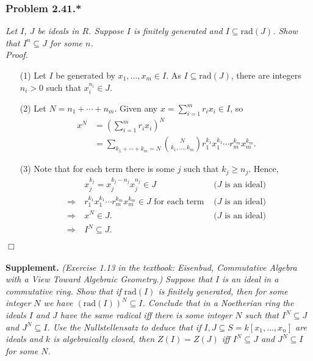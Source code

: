 \documentclass{article}
\begin{document}



\subsubsection*{Problem 2.41.*}
\emph{Let $I$, $J$ be ideals in $R$.
Suppose $I$ is finitely generated and $I \subseteq \mathrm{rad}(J)$.
Show that $I^n \subseteq J$ for some $n$.} \\

\emph{Proof.}
\begin{enumerate}
\item[(1)]
  Let $I$ be generated by $x_1,\ldots,x_m \in I$.
  As $I \subseteq \mathrm{rad}(J)$, there are integers $n_i > 0$
  such that $x_i^{n_i} \in J$.

\item[(2)]
  Let $N = n_1 + \cdots + n_m$.
  Given any $x = \sum_{i=1}^{m} r_i x_i \in I$,
  so
  \begin{align*}
    x^N
    &= \left( \sum_{i=1}^{m} r_i x_i \right)^{N} \\
    &= \sum_{k_1 + \cdots + k_m = N} {N \choose k_1,\ldots,k_m}
      r_1^{k_1} x_1^{k_1} \cdots r_m^{k_m} x_m^{k_m}.
  \end{align*}

\item[(3)]
  Note that for each term there is some $j$ such that $k_j \geq n_j$.
  Hence,
  \begin{align*}
    & \: x_j^{k_j} = x_j^{k_j-n_j} x_j^{n_j} \in J
      &\text{($J$ is an ideal)} \\
    \Longrightarrow& \:
    r_1^{k_1} x_1^{k_1} \cdots r_m^{k_m} x_m^{k_m} \in J \text{ for each term }
      &\text{($J$ is an ideal)} \\
    \Longrightarrow& \:
    x^N \in J.
      &\text{($J$ is an ideal)} \\
    \Longrightarrow& \:
      I^N \subseteq J.
  \end{align*}
\end{enumerate}
$\Box$ \\\\



\textbf{Supplement.}
\emph{(Exercise 1.13 in the textbook:
Eisenbud, Commutative Algebra with a View Toward Algebraic Geometry.)}
\emph{Suppose that $I$ is an ideal in a commutative ring.
Show that if $\mathrm{rad}(I)$ is finitely generated,
then for some integer $N$ we have $(\mathrm{rad}(I))^N \subseteq I$.
Conclude that in a Noetherian ring the ideals $I$ and $J$ have the same radical
iff there is some integer $N$ such that $I^N \subseteq J$ and $J^N \subseteq I$.
Use the Nullstellensatz to deduce that if $I, J \subseteq S = k[x_1,\ldots,x_n]$
are ideals and $k$ is algebraically closed,
then $Z(I) = Z(J)$ iff $I^N \subseteq J$ and $J^N \subseteq I$ for some $N$.} \\
\end{document}
